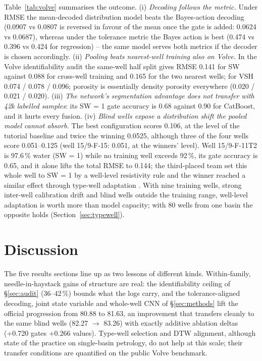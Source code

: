 \documentclass[preprint,12pt]{elsarticle}
\begin{document}
Table~\ref{tab:volve} summarises the outcome. (i) \emph{Decoding follows the metric.} Under RMSE the mean-decoded distribution model beats the Bayes-action decoding (0.0907 vs 0.0807 is reversed in favour of the mean once the gate is added: 0.0624 vs 0.0687), whereas under the tolerance metric the Bayes action is best (0.474 vs 0.396 vs 0.424 for regression) -- the same model serves both metrics if the decoder is chosen accordingly. (ii) \emph{Pooling beats nearest-well training also on Volve.} In the Volve identifiability audit the same-well half split gives RMSE 0.141 for SW against 0.088 for cross-well training and 0.165 for the two nearest wells; for VSH 0.074 / 0.078 / 0.096; porosity is essentially density porosity everywhere (0.020 / 0.021 / 0.020). (iii) \emph{The network's segmentation advantage does not transfer with 42k labelled samples}: its SW = 1 gate accuracy is 0.68 against 0.90 for CatBoost, and it hurts every fusion. (iv) \emph{Blind wells expose a distribution shift the pooled model cannot absorb.} The best configuration scores 0.106, at the level of the tutorial baseline and twice the winning 0.0525, although three of the four wells score 0.051--0.125 (well 15/9-F-15: 0.051, at the winners' level). Well 15/9-F-11T2 is 97.6\,\% water (SW = 1) while no training well exceeds 92\,\%, its gate accuracy is 0.65, and it alone lifts the total RMSE to 0.144; the third-placed team set this whole well to SW = 1 by a well-level resistivity rule and the winner reached a similar effect through type-well adaptation \cite{fu2024contest}. With nine training wells, strong inter-well calibration drift and blind wells outside the training range, well-level adaptation is worth more than model capacity; with 80 wells from one basin the opposite holds (Section~\ref{sec:typewell}).

\section{Discussion}

The five results sections line up as two lessons of different kinds. Within-family, needle-in-haystack gains of structure are real: the identifiability ceiling of \S\ref{sec:audit} (36--42\,\%) bounds what the logs carry, and the tolerance-aligned decoding, joint state variable and whole-well CNN of \S\ref{sec:methods} lift the official progression from 80.88 to 81.63, an improvement that transfers cleanly to the same blind wells (82.27 $\to$ 83.26) with exactly additive ablation deltas (+0.720 gates +0.266 values). Type-well selection and DTW alignment, although state of the practice on single-basin petrology, do not help at this scale; their transfer conditions are quantified on the public Volve benchmark.
\end{document}

